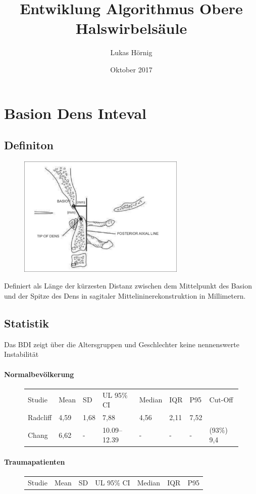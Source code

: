\documentclass{report}
\title{Entwiklung Algorithmus Obere Halswirbelsäule}
\author{Lukas Hörnig}
\date{Oktober 2017}
\begin{document}
\section{Basion Dens Inteval}
\subsection{Definiton}
\begin{figure}
        \includegraphics[width=8cm]{BDI.png}
\end{figure}
Definiert als Länge der kürzesten Distanz zwischen dem Mittelpunkt des Basion und der Spitze des Dens in sagitaler Mittelininerekonstruktion in Millimetern.


\subsection{Statistik}
Das BDI zeigt über die Altersgruppen und Geschlechter keine nennenswerte Instabilität \cite{Chaput2011} 
\paragraph{Normalbevölkerung}
\begin{figure}
        \begin{tabular}{l l l l l l l l}
                Studie    & Mean  & SD    & UL 95\% CI & Median   & IQR   & P95 & Cut-Off \\
                Radcliff \cite{Radcliff2010} & 4,59 & 1,68 & 7,88 & 4,56 & 2,11 & 7,52 \\
                Chang \cite{Chang2009} & 6,62 & - & 10.09–12.39 & - & - & - & (93\%) 9,4 \\
                
                
        \end{tabular}
        \end{figure}
\paragraph{Traumapatienten}
\begin{figure}
        \begin{tabular}{l l l l l l l}
                Studie    & Mean  & SD    & UL 95\% CI & Median   & IQR   & P95 \\
                
                        
        \end{tabular}
        \end{figure}
\end{document}
